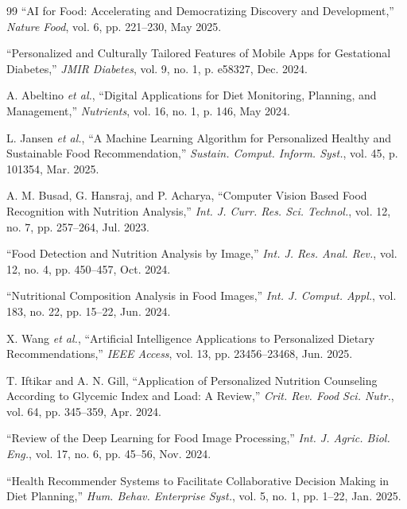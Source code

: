 \documentclass[conference]{IEEEtran}
\begin{document}
\begin{thebibliography}{99}
    ``AI for Food: Accelerating and Democratizing Discovery and Development,'' \textit{Nature Food}, vol. 6, pp. 221--230, May 2025.
    \vspace{5pt}

    ``Personalized and Culturally Tailored Features of Mobile Apps for Gestational Diabetes,'' \textit{JMIR Diabetes}, vol. 9, no. 1, p. e58327, Dec. 2024.
    \vspace{5pt}

    A. Abeltino \textit{et al.}, ``Digital Applications for Diet Monitoring, Planning, and Management,'' \textit{Nutrients}, vol. 16, no. 1, p. 146, May 2024.
    \vspace{5pt}

    L. Jansen \textit{et al.}, ``A Machine Learning Algorithm for Personalized Healthy and Sustainable Food Recommendation,'' \textit{Sustain. Comput. Inform. Syst.}, vol. 45, p. 101354, Mar. 2025.
    \vspace{5pt}

    A. M. Busad, G. Hansraj, and P. Acharya, ``Computer Vision Based Food Recognition with Nutrition Analysis,'' \textit{Int. J. Curr. Res. Sci. Technol.}, vol. 12, no. 7, pp. 257--264, Jul. 2023.
    \vspace{5pt}

    ``Food Detection and Nutrition Analysis by Image,'' \textit{Int. J. Res. Anal. Rev.}, vol. 12, no. 4, pp. 450--457, Oct. 2024.
    \vspace{5pt}

    ``Nutritional Composition Analysis in Food Images,'' \textit{Int. J. Comput. Appl.}, vol. 183, no. 22, pp. 15--22, Jun. 2024.
    \vspace{5pt}

    X. Wang \textit{et al.}, ``Artificial Intelligence Applications to Personalized Dietary Recommendations,'' \textit{IEEE Access}, vol. 13, pp. 23456--23468, Jun. 2025.
    \vspace{5pt}

    T. Iftikar and A. N. Gill, ``Application of Personalized Nutrition Counseling According to Glycemic Index and Load: A Review,'' \textit{Crit. Rev. Food Sci. Nutr.}, vol. 64, pp. 345--359, Apr. 2024.
    \vspace{5pt}

    ``Review of the Deep Learning for Food Image Processing,'' \textit{Int. J. Agric. Biol. Eng.}, vol. 17, no. 6, pp. 45--56, Nov. 2024.
    \vspace{5pt}

    ``Health Recommender Systems to Facilitate Collaborative Decision Making in Diet Planning,'' \textit{Hum. Behav. Enterprise Syst.}, vol. 5, no. 1, pp. 1--22, Jan. 2025.
    \vspace{5pt}

    \end{thebibliography}
    
\end{document}
